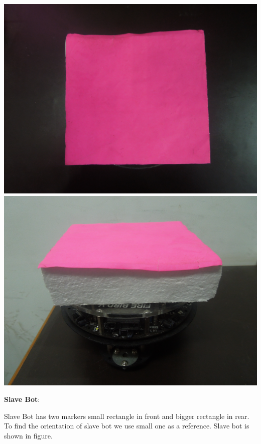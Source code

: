 \documentclass[report]{res}
\begin{document}
	\begin{center}  
	\includegraphics[scale = 0.05]{graphics/pics/DSCN0034.jpg}
	\includegraphics[scale = 0.05]{graphics/pics/DSCN0038.jpg} \\
	\end{center}
	
	\pagebreak	
    
    
    \textbf{\large Slave Bot}:	
	
	Slave Bot has two markers small rectangle in front and bigger rectangle in rear. To find the orientation of slave bot we use small one as a reference. Slave bot is shown in figure.\\	
	
\end{document}
